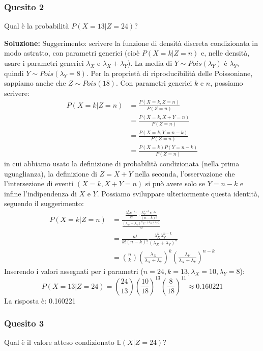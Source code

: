 \documentclass[12pt, a4paper]{article}
\begin{document}
\newpage

\subsubsection*{Quesito 2}
Qual è la probabilità $P(X=13|Z=24)$?

\textbf{Soluzione:}
Suggerimento: scrivere la funzione di densità discreta condizionata in modo astratto, con parametri generici (cioè $P(X=k|Z=n)$ e, nelle densità, usare i parametri generici $\lambda_X$ e $\lambda_X+\lambda_Y$).
La media di $Y \sim Pois(\lambda_Y)$ è $\lambda_Y$, quindi $Y \sim Pois(\lambda_Y=8)$.
Per la proprietà di riproducibilità delle Poissoniane, sappiamo anche che $Z \sim Pois(18)$.
Con parametri generici $k$ e $n$, possiamo scrivere:
$$ \begin{aligned} P(X=k|Z=n) &= \frac{P(X=k,Z=n)}{P(Z=n)} \\ &= \frac{P(X=k,X+Y=n)}{P(Z=n)} \\ &= \frac{P(X=k,Y=n-k)}{P(Z=n)} \\ &= \frac{P(X=k)P(Y=n-k)}{P(Z=n)} \end{aligned} $$
in cui abbiamo usato la definizione di probabilità condizionata (nella prima uguaglianza), la definizione di $Z=X+Y$ nella seconda, l’osservazione che l’intersezione di eventi $(X=k, X+Y=n)$ si può avere solo se $Y=n-k$ e infine l’indipendenza di $X$ e $Y$.
Possiamo sviluppare ulteriormente questa identità, seguendo il suggerimento:
$$ \begin{aligned} P(X=k|Z=n) &= \frac{\frac{\lambda_X^k e^{-\lambda_X}}{k!} \cdot \frac{\lambda_Y^{n-k} e^{-\lambda_Y}}{(n-k)!}}{\frac{(\lambda_X+\lambda_Y)^n e^{-(\lambda_X+\lambda_Y)}}{n!}} \\ &= \frac{n!}{k!(n-k)!} \frac{\lambda_X^k \lambda_Y^{n-k}}{(\lambda_X+\lambda_Y)^n} \\ &= \binom{n}{k} \left(\frac{\lambda_X}{\lambda_X+\lambda_Y}\right)^k \left(\frac{\lambda_Y}{\lambda_X+\lambda_Y}\right)^{n-k} \end{aligned} $$
Inserendo i valori assegnati per i parametri ($n=24, k=13, \lambda_X=10, \lambda_Y=8$):
$$ P(X=13|Z=24) = \binom{24}{13} \left(\frac{10}{18}\right)^{13} \left(\frac{8}{18}\right)^{11} \approx 0.160221 $$
La risposta è: 0.160221

\subsubsection*{Quesito 3}
Qual è il valore atteso condizionato $\mathbb{E}(X|Z=24)$?
\end{document}
